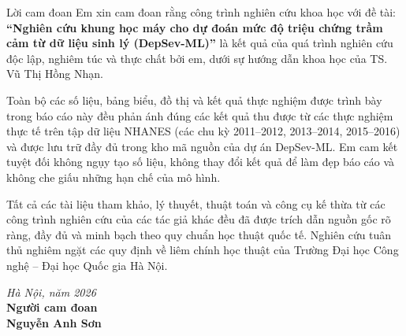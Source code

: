 \documentclass{uetgraduation}
\begin{document}
\begin{preamble}{Lời cam đoan}
Em xin cam đoan rằng công trình nghiên cứu khoa học với đề tài: \textbf{“Nghiên cứu khung học máy cho dự đoán mức độ triệu chứng trầm cảm từ dữ liệu sinh lý (DepSev-ML)”} là kết quả của quá trình nghiên cứu độc lập, nghiêm túc và thực chất bởi em, dưới sự hướng dẫn khoa học của TS. Vũ Thị Hồng Nhạn.

Toàn bộ các số liệu, bảng biểu, đồ thị và kết quả thực nghiệm được trình bày trong báo cáo này đều phản ánh đúng các kết quả thu được từ các thực nghiệm thực tế trên tập dữ liệu NHANES (các chu kỳ 2011--2012, 2013--2014, 2015--2016) và được lưu trữ đầy đủ trong kho mã nguồn của dự án DepSev-ML. Em cam kết tuyệt đối không ngụy tạo số liệu, không thay đổi kết quả để làm đẹp báo cáo và không che giấu những hạn chế của mô hình.

Tất cả các tài liệu tham khảo, lý thuyết, thuật toán và công cụ kế thừa từ các công trình nghiên cứu của các tác giả khác đều đã được trích dẫn nguồn gốc rõ ràng, đầy đủ và minh bạch theo quy chuẩn học thuật quốc tế. Nghiên cứu tuân thủ nghiêm ngặt các quy định về liêm chính học thuật của Trường Đại học Công nghệ -- Đại học Quốc gia Hà Nội.

\vspace{1.5cm}
\begin{flushright}
\textit{Hà Nội, năm 2026}\\[0.2cm]
\textbf{Người cam đoan}\\[1.5cm]
\textbf{Nguyễn Anh Sơn}
\end{flushright}
\end{preamble}
\end{document}
